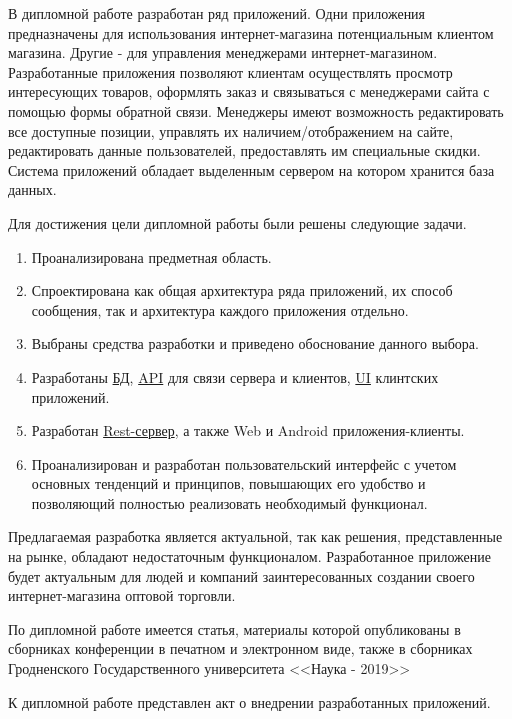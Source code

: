\indent

В дипломной работе разработан ряд приложений.
Одни приложения предназначены для использования интернет-магазина потенциальным клиентом магазина.
Другие -  для управления менеджерами интернет-магазином.
Разработанные приложения позволяют клиентам осуществлять просмотр интересующих товаров, оформлять заказ и связываться с менеджерами сайта с помощью формы обратной связи.
Менеджеры имеют возможность редактировать все доступные позиции, управлять их наличием/отображением на сайте, редактировать данные пользователей, предоставлять им специальные скидки.
Система приложений обладает выделенным сервером на котором хранится база данных.

Для достижения цели дипломной работы были решены следующие задачи.
\begin{enumerate}
    \item Проанализирована предметная область.
    \item Спроектирована как общая архитектура ряда приложений, их способ сообщения, так и архитектура каждого приложения отдельно.
    \item Выбраны средства разработки и приведено обоснование данного выбора.
    \item Разработаны \hyperlink{gloss:db}{БД}, \hyperlink{gloss:api}{API} для связи сервера и клиентов, \hyperlink{gloss:ui}{UI} клинтских приложений.
    \item Разработан \hyperlink{gloss:rest}{Rest-сервер}, а также Web и Android приложения-клиенты.
    \item Проанализирован и разработан пользовательский интерфейс с учетом основных тенденций и принципов, повышающих его удобство и позволяющий полностью реализовать необходимый функционал.
\end{enumerate}

Предлагаемая разработка является актуальной, так как решения, представленные на рынке, обладают недостаточным функционалом.
Разработанное приложение будет актуальным для людей и компаний заинтересованных создании своего интернет-магазина оптовой торговли.

По дипломной работе имеется статья, материалы которой опубликованы в сборниках конференции в печатном и электронном виде, 
также в сборниках Гродненского Государственного университета <<Наука - 2019>>

К дипломной работе представлен акт о внедрении разработанных приложений.